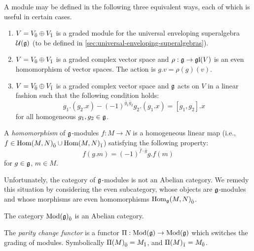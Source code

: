 \begin{definition}
  A module may be defined in the following three equivalent ways, each of which is useful in certain cases.
  \begin{enumerate}
  \item $V = {V}_{\bar{0}} \oplus {V}_{\bar{1}}$ is a graded module for the universal enveloping superalgebra $\mathcal{U}(\mathfrak{g})$ (to be defined in \ref{sec:universal-enveloping-superalgebras}).
  \item $V = {V}_{\bar{0}} \oplus {V}_{\bar{1}}$ is a graded complex vector space and $\rho : \mathfrak{g} \to \mathfrak{gl}(V)$ is an even homomorphism of vector spaces. The action is $g.v = \rho(g)(v)$.
  \item $V = {V}_{\bar{0}} \oplus {V}_{\bar{1}}$ is a graded complex vector space and $\mathfrak{g}$ acts on $V$ in a linear fashion such that the following condition holds:
\begin{equation}
  g_1.(g_2.x) - (-1)^{\bar g_1 \bar g_2} g_2. (g_1.x) = [g_1,g_2].x
\end{equation}
for all homogeneous $g_1, g_2 \in \mathfrak{g}$.
  \end{enumerate}
\end{definition}

\begin{definition}
  A \emph{homomorphism} of $\mathfrak{g}$-modules $f: M \to N$ is a homogeneous linear map (i.e., $f \in {\operatorname{Hom}(M,N)}_{\bar{0}} \cup {\operatorname{Hom}(M,N)}_{\bar{1}}$) satisfying the following property:
  \[
    f(g.m) = (-1)^{\bar f \cdot \bar g} g.f(m)
  \]
  for $g \in \mathfrak{g}$, $m \in M$.
\end{definition}

Unfortunately, the category of $\mathfrak{g}$-modules is not an Abelian category. We remedy this situation by considering the even subcategory, whose objects are $\mathfrak{g}$-modules and whose morphisms are even homomorphisms ${\operatorname{Hom}_{\mathfrak{g}}(M,N)}_{\bar{0}}$.

\begin{proposition}
  The category ${\operatorname{Mod}(\mathfrak{g})}_{\bar{0}}$ is an Abelian category.
\end{proposition}

\begin{definition}
  The \emph{parity change functor} is a functor $\Pi: \operatorname{Mod}(\mathfrak{g}) \to \operatorname{Mod}(\mathfrak{g})$ which switches the grading of modules. Symbolically ${\Pi(M)}_{\bar{0}} = {M}_{\bar{1}}$, and ${\Pi(M)}_{\bar{1}} = {M}_{\bar{0}}$.
\end{definition}

